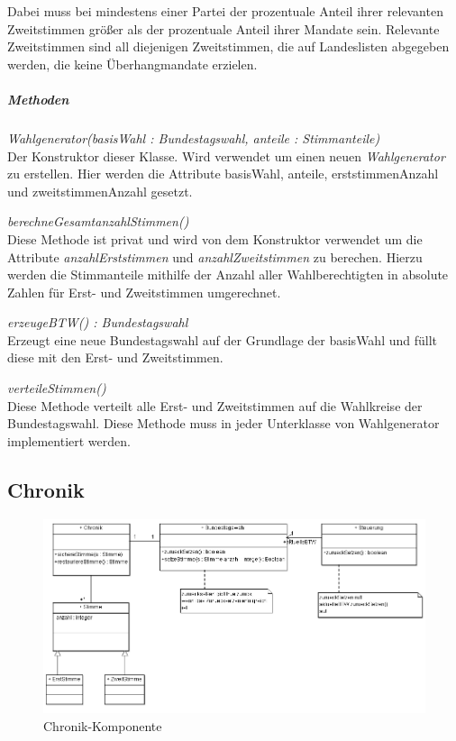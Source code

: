 \documentclass[12pt,a4paper,titlepage]{article}
\newcommand{\mymo}{\fontfamily{pcr}\selectfont \textit}
\begin{document}
Dabei muss bei mindestens einer Partei der prozentuale Anteil ihrer relevanten Zweitstimmen größer als der prozentuale Anteil ihrer Mandate sein. Relevante Zweitstimmen sind all diejenigen Zweitstimmen, die auf Landeslisten abgegeben werden, die keine Überhangmandate erzielen.

\subparagraph{Methoden}
\begin{description}
\item {\mymo{Wahlgenerator(basisWahl : Bundestagswahl, anteile : Stimmanteile)}} \\
Der Konstruktor dieser Klasse. Wird verwendet um einen neuen {\mymo{Wahlgenerator}} zu erstellen. Hier werden die Attribute basisWahl, anteile, erststimmenAnzahl und zweitstimmenAnzahl gesetzt.
\item {\mymo{berechneGesamtanzahlStimmen()}} \\
Diese Methode ist privat und wird von dem Konstruktor verwendet um die Attribute {\mymo{anzahlErststimmen}} und {\mymo{anzahlZweitstimmen}} zu berechen. Hierzu werden die Stimmanteile mithilfe der Anzahl aller Wahlberechtigten in absolute Zahlen für Erst- und Zweitstimmen umgerechnet.
\item {\mymo{erzeugeBTW() : Bundestagswahl}} \\
Erzeugt eine neue Bundestagswahl auf der Grundlage der basisWahl und füllt diese mit den Erst- und Zweitstimmen.
\item {\mymo{verteileStimmen()}} \\
Diese Methode verteilt alle Erst- und Zweitstimmen auf die Wahlkreise der Bundestagswahl. Diese Methode muss in jeder Unterklasse von Wahlgenerator implementiert werden.
\end{description}

\newpage
\subsection{Chronik}
\begin{figure}[!ht]
\includegraphics[scale=0.7]{Klassendiagramme/Chronik_Ausschnitt} \caption{Chronik-Komponente} 
\end{figure}
\end{document}
